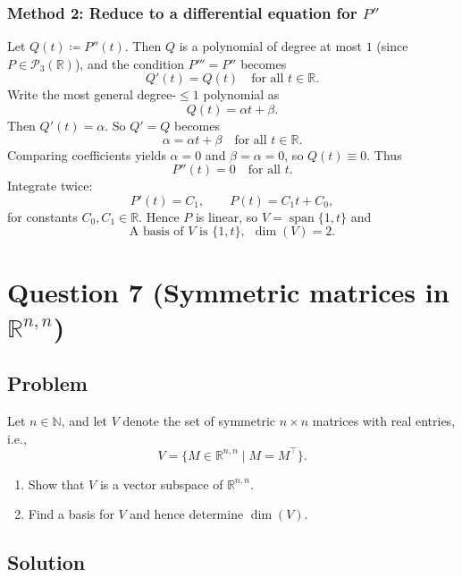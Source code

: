 \documentclass[12pt]{article}
\newcommand{\R}{\mathbb{R}}
\newcommand{\Span}{\operatorname{span}}
\newcommand{\Pthree}{\mathcal{P}_3(\R)}
\begin{document}
\subsubsection{Method 2: Reduce to a differential equation for \(P''\)}
Let \(Q(t)\coloneqq P''(t)\).
Then \(Q\) is a polynomial of degree at most \(1\) (since \(P\in\Pthree\)), and the condition \(P'''=P''\) becomes
\[
Q'(t)=Q(t)\quad\text{for all }t\in\R.
\]
Write the most general degree-\(\le 1\) polynomial as
\[
Q(t)=\alpha t+\beta.
\]
Then \(Q'(t)=\alpha\).
So \(Q'=Q\) becomes
\[
\alpha = \alpha t+\beta\quad\text{for all }t\in\R.
\]
Comparing coefficients yields \(\alpha=0\) and \(\beta=\alpha=0\), so \(Q(t)\equiv 0\).
Thus
\[
P''(t)=0\quad\text{for all }t.
\]
Integrate twice:
\[
P'(t)=C_1,\qquad P(t)=C_1 t + C_0,
\]
for constants \(C_0,C_1\in\R\).
Hence \(P\) is linear, so \(V=\Span\{1,t\}\) and
\[
\boxed{\,\text{A basis of }V\text{ is }\{1,t\},\ \ \dim(V)=2.\,}
\]

\newpage
\section{Question 7 (Symmetric matrices in \(\R^{n,n}\))}
\subsection{Problem}
Let \(n\in\mathbb{N}\), and let \(V\) denote the set of symmetric \(n\times n\) matrices with real entries, i.e.,
\[
V=\{M\in \R^{n,n}\mid M=M^\top\}.
\]
\begin{enumerate}[label=(\alph*)]
\item Show that \(V\) is a vector subspace of \(\R^{n,n}\).
\item Find a basis for \(V\) and hence determine \(\dim(V)\).
\end{enumerate}

\subsection{Solution}
\end{document}
